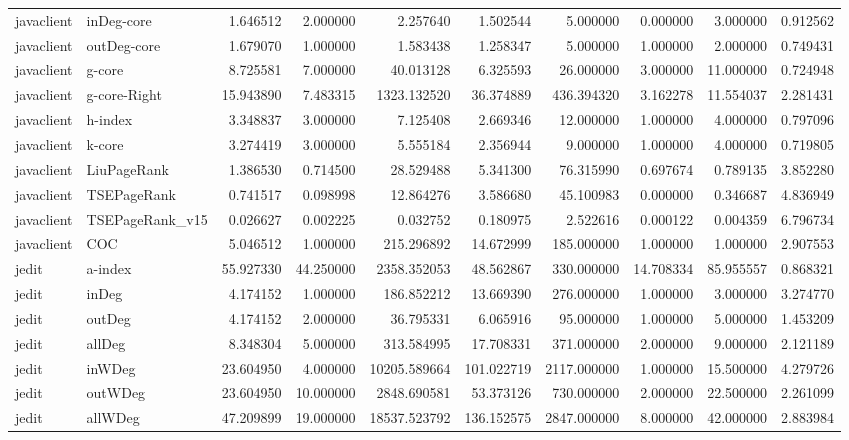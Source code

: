 \begin{tabular}{llrrrrrrrr}
javaclient & inDeg-core & 1.646512 & 2.000000 & 2.257640 & 1.502544 & 5.000000 & 0.000000 & 3.000000 & 0.912562 \\
javaclient & outDeg-core & 1.679070 & 1.000000 & 1.583438 & 1.258347 & 5.000000 & 1.000000 & 2.000000 & 0.749431 \\
javaclient & g-core & 8.725581 & 7.000000 & 40.013128 & 6.325593 & 26.000000 & 3.000000 & 11.000000 & 0.724948 \\
javaclient & g-core-Right & 15.943890 & 7.483315 & 1323.132520 & 36.374889 & 436.394320 & 3.162278 & 11.554037 & 2.281431 \\
javaclient & h-index & 3.348837 & 3.000000 & 7.125408 & 2.669346 & 12.000000 & 1.000000 & 4.000000 & 0.797096 \\
javaclient & k-core & 3.274419 & 3.000000 & 5.555184 & 2.356944 & 9.000000 & 1.000000 & 4.000000 & 0.719805 \\
javaclient & LiuPageRank & 1.386530 & 0.714500 & 28.529488 & 5.341300 & 76.315990 & 0.697674 & 0.789135 & 3.852280 \\
javaclient & TSEPageRank & 0.741517 & 0.098998 & 12.864276 & 3.586680 & 45.100983 & 0.000000 & 0.346687 & 4.836949 \\
javaclient & TSEPageRank_v15 & 0.026627 & 0.002225 & 0.032752 & 0.180975 & 2.522616 & 0.000122 & 0.004359 & 6.796734 \\
javaclient & COC & 5.046512 & 1.000000 & 215.296892 & 14.672999 & 185.000000 & 1.000000 & 1.000000 & 2.907553 \\
jedit & a-index & 55.927330 & 44.250000 & 2358.352053 & 48.562867 & 330.000000 & 14.708334 & 85.955557 & 0.868321 \\
jedit & inDeg & 4.174152 & 1.000000 & 186.852212 & 13.669390 & 276.000000 & 1.000000 & 3.000000 & 3.274770 \\
jedit & outDeg & 4.174152 & 2.000000 & 36.795331 & 6.065916 & 95.000000 & 1.000000 & 5.000000 & 1.453209 \\
jedit & allDeg & 8.348304 & 5.000000 & 313.584995 & 17.708331 & 371.000000 & 2.000000 & 9.000000 & 2.121189 \\
jedit & inWDeg & 23.604950 & 4.000000 & 10205.589664 & 101.022719 & 2117.000000 & 1.000000 & 15.500000 & 4.279726 \\
jedit & outWDeg & 23.604950 & 10.000000 & 2848.690581 & 53.373126 & 730.000000 & 2.000000 & 22.500000 & 2.261099 \\
jedit & allWDeg & 47.209899 & 19.000000 & 18537.523792 & 136.152575 & 2847.000000 & 8.000000 & 42.000000 & 2.883984 \\

\end{tabular}
